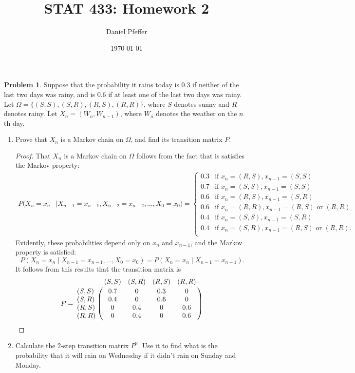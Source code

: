 \documentclass[oneside,reqno]{amsart}
\title{STAT 433: Homework 2}
\author{Daniel Pfeffer}
\date{\today}
\theoremstyle{definition}
\newtheorem{prob}{Problem}
\begin{document}
\maketitle


\begin{prob}
Suppose that the probability it rains today is 0.3 if neither of the last two days was rainy, and is 0.6 if at least one of the last two days was rainy. Let $\Omega = \{(S,S), (S,R), (R,S), (R,R)\}$, where $S$ denotes sunny and $R$ denotes rainy. Let $X_n = (W_n, W_{n-1})$, where $W_n$ denotes the weather on the $n$th day.
\end{prob}


\begin{enumerate}
\item
Prove that $X_n$ is a Markov chain on $\Omega$, and find its transition matrix $P$.
\begin{proof}
That $X_n$ is a Markov chain on $\Omega$ follows from the fact that is satisfies the Markov property:
\begin{align*}
	P(X_n = x_n & \mid X_{n-1} = x_{n-1}, X_{n-2} = x_{n-2}, \dotsc, X_0 = x_0) 
	= \begin{cases}
		0.3 & \text{if } x_n = (R,S), x_{n-1}= (S,S) \\
		0.7 & \text{if } x_n = (S,S), x_{n-1}= (S,S) \\
		0.6 & \text{if } x_n = (R,S), x_{n-1}= (S,R) \\
		0.6 & \text{if } x_n = (R,R), x_{n-1}= (R,S) \text{ or } (R,R) \\
		0.4 & \text{if } x_n = (S,S), x_{n-1}= (S,R) \\
		0.4 & \text{if } x_n = (S,R), x_{n-1}= (R,S) \text{ or } (R,R). \\
	\end{cases}
\end{align*}
Evidently, these probabilities depend only on $x_n$ and $x_{n-1}$, and the Markov property is satisfied: 
\[
	 P(X_n = x_n  \mid X_{n-1} = x_{n-1}, \dotsc, X_0 = x_0) = P(X_n = x_n \mid X_{n-1} = x_{n-1}).
\]
It follows from this results that the transition matrix is 
\[
	P = \bordermatrix{~ & (S,S) & (S,R) & (R,S) &(R,R) \cr 
		(S,S) & 0.7 & 0 & 0.3 & 0 \cr
		(S,R) & 0.4 & 0 & 0.6 & 0 \cr
		(R,S) & 0 & 0.4 & 0 & 0.6 \cr
		(R,R) & 0 & 0.4 & 0 & 0.6 \cr}
\]
\end{proof}
\item
Calculate the 2-step transition matrix $P^2$. Use it to find what is the probability that it will rain on Wednesday if it didn't rain on Sunday and Monday.

\end{enumerate}
\end{document}
